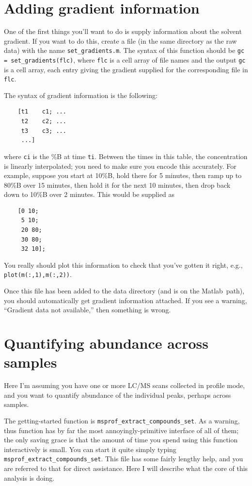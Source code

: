 \documentclass[notitlepage]{revtex4-1}
\newcommand{\matlab}{{\sc Matlab}}
\begin{document}
\section{Adding gradient information}

One of the first things you'll want to do is supply information about the solvent gradient.  If you want to do this,
 create a file (in the same directory as the raw data) with the name
\verb|set_gradients.m|.  The syntax of this function should be \verb|gc = set_gradients(flc)|,  where \verb|flc| is a cell array of file names and the output \verb|gc| is a cell array, each entry giving the gradient supplied for the
     corresponding file in \verb|flc|.

 The syntax of gradient information is the following:
\begin{verbatim}
    [t1    c1; ...
     t2    c2; ...
     t3    c3; ...
     ...]
\end{verbatim}
 where \verb|ci| is the \%B at time \verb|ti|.  Between the times in this table, the concentration is linearly
 interpolated; you need to make sure you encode this
 accurately.  For example, suppose you start at 10\%B, hold there for 5
 minutes, then ramp up to 80\%B over 15 minutes, then hold it for the
 next 10 minutes, then drop back down to 10\%B over 2 minutes.  This
 would be supplied as
\begin{verbatim}
    [0 10;
     5 10;
     20 80;
     30 80;
     32 10];
\end{verbatim}
 You really should plot this information to check that you've gotten it
 right, e.g., \verb|plot(m(:,1),m(:,2))|.

Once this file has been added to the data directory (and is on the \matlab\ path), you should automatically get gradient information attached.  If you see a warning, ``Gradient data not available,'' then something is wrong.


\section{Quantifying abundance across samples}

Here I'm assuming you have one or more LC/MS scans collected in profile mode, and you want to quantify abundance of the individual peaks, perhaps across samples.

The getting-started function is \verb|msprof_extract_compounds_set|.  As a warning, thus function has by far the most annoyingly-primitive interface of all of them; the only saving grace is that the amount of time you spend using this function interactively is small.  You can start it quite simply typing \verb|msprof_extract_compounds_set|.  This file has some fairly lengthy help, and you are referred to that for direct assistance.  Here I will describe what the core of this analysis is doing.
\end{document}
